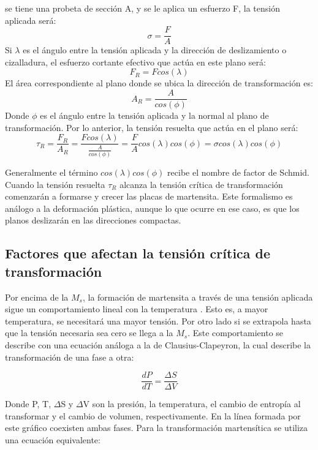 \documentclass[a4paper,12pt,fleqn,twoside,openany]{book}
\begin{document}
 se tiene una probeta de 
sección A, y se le aplica un esfuerzo F, la tensión aplicada será:
\begin{equation}
 \sigma = \frac{F}{A}
\end{equation}
Si $\lambda$ es el ángulo entre la tensión aplicada y la dirección de deslizamiento o cizalladura, el esfuerzo cortante efectivo que actúa en este plano será:
\begin{equation}
 F_{R}= F cos(\lambda)
\end{equation}
El área correspondiente al plano donde se ubica la dirección de transformación es:
\begin{equation}
 A_{R}=\frac{A}{cos(\phi)}
\end{equation}
Donde $\phi$ es el ángulo entre la tensión aplicada y la normal al plano de transformación. Por lo anterior, la tensión resuelta que actúa en el plano será:
\begin{equation}
 \tau_{R}=\frac{F_{R}}{A_{R}}= \frac{Fcos(\lambda) }{\frac{A}{cos(\phi)}}=\frac{F}{A} cos(\lambda)cos(\phi) = \sigma cos(\lambda)cos(\phi)
\end{equation}

Generalmente el término $cos(\lambda)cos(\phi)$ recibe el nombre de factor de Schmid. Cuando la tensión resuelta $\tau_R$ alcanza la tensión crítica de transformación comenzarán a formarse y crecer las placas de martensita. Este formalismo es análogo a la deformación plástica, aunque lo que ocurre en ese caso, es que los planos deslizarán en las direcciones compactas.


\subsection{Factores que afectan la tensión crítica de transformación}


Por encima de la $M_s$, la formación de martensita a través de una tensión aplicada sigue un comportamiento lineal con la temperatura \cite{pierre}. Esto es, a mayor temperatura, se 
necesitará una mayor tensión. Por otro lado si se extrapola hasta que la tensión necesaria sea cero se llega a la $M_s$. Este comportamiento se describe con una ecuación 
análoga a la de Clausius-Clapeyron, la cual describe la transformación de una fase a otra:

\begin{equation}
 \frac{dP}{dT}=\frac{\Delta S}{\Delta V}
\end{equation}

Donde P, T, $\Delta$S y $\Delta$V son la presión, la temperatura, el cambio de entropía al transformar y el cambio de volumen, respectivamente. En la línea formada por este gráfico 
coexisten ambas fases. Para la transformación martensítica se utiliza una ecuación equivalente:
\end{document}
